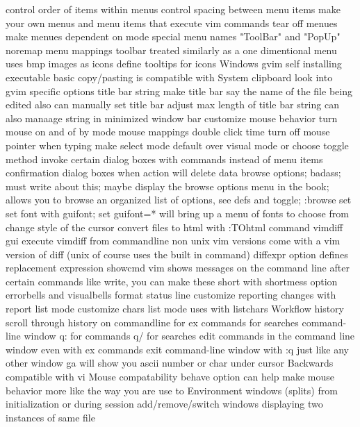 \documentclass[12pt]{book}
\begin{document}
{{      control order of items within menus
      control spacing between menu items
      make your own menus and menu items that execute vim commands
      tear off menues
      make menues dependent on mode
      special menu names "ToolBar" and "PopUp"
      noremap menu mappings
    toolbar
      treated similarly as a one dimentional menu
      uses bmp images as icons
      define tooltips for icons
    Windows gvim
      self installing executable
      basic copy/pasting is compatible with System clipboard
    look into gvim specific options
    title bar string
      make title bar say the name of the file being edited
      also can manually set title bar
      adjust max length of title bar string
      can also manaage string in minimized window bar
    customize mouse behavior
      turn mouse on and of by mode
      mouse mappings
      double click time
      turn off mouse pointer when typing
    make select mode default over visual mode or choose toggle method
    invoke certain dialog boxes with commands instead of menu items
    confirmation dialog boxes when action will delete data
    browse options; badass; must write about this; maybe display the browse options menu in the book; allows you to browse an organized list of options, see defs and toggle; :browse set
    set font with guifont; set guifont=* will bring up a menu of fonts to choose from
    change style of the cursor
  convert files to html with :TOhtml command
  vimdiff gui
    execute vimdiff from commandline
    non unix vim versions come with a vim version of diff (unix of course uses the built in command)
    diffexpr option defines replacement expression
  showcmd
  vim shows messages on the command line after certain commands like write, you can make these short with shortmess option
  errorbells and visualbells
  format status line
    customize reporting changes with report
  list mode
    customize chars list mode uses with listchars
Workflow
  history
    scroll through history on commandline
      for ex commands
      for searches
    command-line window
      q: for commands
      q/ for searches
      edit commands in the command line window even with ex commands
      exit command-line window with :q just like any other window
  ga will show you ascii number or char under cursor
  Backwards compatible with vi
  Mouse compatability
    behave option can help make mouse behavior more like the way you are use to
  Environment
    windows (splits)
      from initialization or during session
      add/remove/switch windows
      displaying two instances of same file
}}
\end{document}
